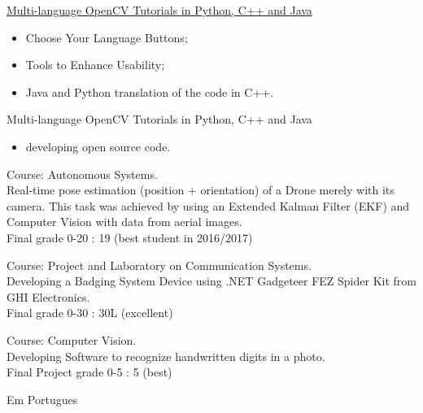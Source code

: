 \documentclass{article}
\begin{document}
\begin{llist}
{
\href{https://summerofcode.withgoogle.com/archive/2016/projects/6414610965987328/}{Multi-language OpenCV Tutorials in Python, C++ and Java}
\vspace{-0.33cm}
\begin{itemize}
\item[\textendash] Choose Your Language Buttons;
\item[\textendash] Tools to Enhance Usability;
\item[\textendash] Java and Python translation of the code in C++.
\end{itemize}
}
{
Multi-language OpenCV Tutorials in Python, C++ and Java
\vspace{-0.33cm}
\begin{itemize}
 \item developing open source code.
\end{itemize}
}

{
\vspace{-0.4cm}

 
Course: Autonomous Systems.\\
Real-time pose estimation (position + orientation) of a Drone merely with its camera. This task was achieved by using an Extended Kalman Filter (EKF) and Computer Vision with data from aerial images.\\
Final grade 0-20 : 19 (best student in 2016/2017)

 
Course: Project and Laboratory on Communication	Systems.\\
Developing a Badging System Device using .NET Gadgeteer FEZ Spider Kit from GHI Electronics.\\
Final grade 0-30 : 30L (excellent)

 
Course: Computer Vision.\\
Developing Software to recognize handwritten digits in a photo.\\
Final Project grade 0-5 : 5 (best)

}
{

Em Portugues

}
\end{llist}
\end{document}
